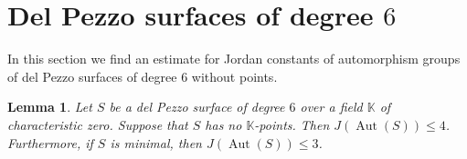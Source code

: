 \documentclass[12pt]{amsart}
\newcounter{cequation}[section]
\newtheorem{lemma}[cequation]{Lemma}
\theoremstyle{definition}
\theoremstyle{remark}
\newcommand{\KK}{\mathbb{K}}
\newcommand{\Aut}{\operatorname{Aut}}
\def \le {\leqslant}
\begin{document}
\section{Del Pezzo surfaces of degree $6$}
\label{section:dP6}

In this section we find an estimate for Jordan constants
of automorphism groups of del Pezzo surfaces of degree $6$
without points.






\begin{lemma}\label{lemma:dP6}
Let $S$ be a del Pezzo surface of degree $6$ over a field $\KK$ of characteristic
zero. Suppose that
$S$ has no $\KK$-points. Then $J(\Aut(S))\le 4$.
Furthermore, if $S$ is minimal, then $J(\Aut(S))\le 3$.
\end{lemma}
\end{document}
